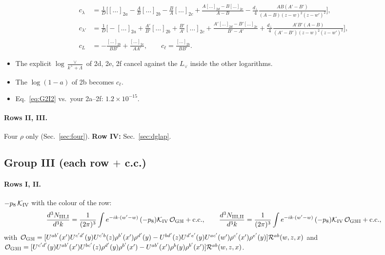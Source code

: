 \documentclass[10pt]{article}
\numberwithin{equation}{section}
\newcommand{\Lv}{L_{\vee}}
\newcommand{\Rc}{\mathcal R}
\newcommand{\OO}{\mathcal O}
\newcommand{\KK}{\mathcal K}
\newcommand{\pre}{\frac{1}{(2\pi)^3}}
\newcommand{\phw}{e^{-ik\cdot(w'-w)}}
\begin{document}
\begin{align*}
c_\lambda&=\frac1D\Big[[\dots]_{2a}-\frac AB[\dots]_{2b}-\frac BA[\dots]_{2c}+\frac{A[\dots]_{2d}-B[\dots]_{2e}}{A-B}-\frac{d_\perp}{4}\frac{AB(A'-B')}{(A-B)(z-w)^2(z-w')^2}\Big],\\
c_{\lambda'}&=\frac1D\Big[-[\dots]_{2a}+\frac{A'}{B'}[\dots]_{2b}+\frac{B'}{A'}[\dots]_{2c}+\frac{A'[\dots]_{2d}-B'[\dots]_{2e}}{B'-A'}+\frac{d_\perp}{4}\frac{A'B'(A-B)}{(A'-B')(z-w)^2(z-w')^2}\Big],\\
c_L&=-\frac{[\dots]_{2b}}{BB'}+\frac{[\dots]_{2c}}{AA'},\qquad c_\ell=\frac{[\dots]_{2b}}{BB'}.
\end{align*}
\begin{itemize}
\item The explicit $\log\frac{\vee}{k^++\Lambda}$ of 2d, 2e, 2f cancel against the $\Lv$ inside the other logarithms.
\item The $\log(1-a)$ of 2b becomes $c_\ell$.
\item Eq.~\eqref{eq:G2I2} vs.\ your 2a--2f: $1.2\times10^{-15}$.
\end{itemize}
\paragraph{Rows II, III.} Four $\rho$ only (Sec.~\ref{sec:four}). \textbf{Row IV:} Sec.~\ref{sec:dglap}.

\subsection{Group III (each row $+$ c.c.)}
\paragraph{Rows I, II.} $-p_8\,\KK_{\rm IV}$ with the colour of the row:
\begin{equation}
\frac{d^3N_{\rm III,I}}{d^3k}=\pre\int\phw\,(-p_8)\KK_{\rm IV}\,\OO_{\rm G3I}+{\rm c.c.},\qquad\frac{d^3N_{\rm III,II}}{d^3k}=\pre\int\phw\,(-p_8)\KK_{\rm IV}\,\OO_{\rm G3II}+{\rm c.c.},
\label{eq:G3I}
\end{equation}
with $\OO_{\rm G3I}=[U^{ab'}(x')U^{c'd'}(y)U^{c'b}(z)\rho^{b'}(x')\rho^{d'}(y)-U^{bd'}(z)U^{d'e'}(y)U^{ac'}(w')\rho^{c'}(x')\rho^{e'}(y)]\Rc^{ab}(w,z,x)$ and $\OO_{\rm G3II}=[U^{c'd'}(y)U^{ab'}(x')U^{bc'}(z)\rho^{d'}(y)\rho^{b'}(x')-U^{ab'}(x')\rho^b(y)\rho^{b'}(x')]\Rc^{ab}(w,z,x)$.
\end{document}
